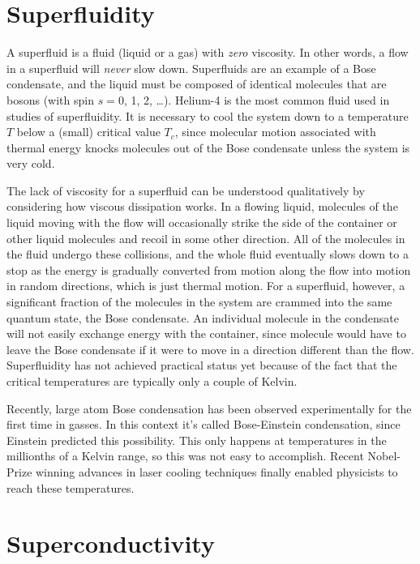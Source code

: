 \section{Superfluidity}

A superfluid is a fluid (liquid or a gas) with {\em zero} viscosity.
In other words, a flow in a superfluid will {\em never} slow down.
Superfluids are an example of a Bose condensate, and the liquid must
be composed of identical molecules that are bosons (with spin $s = 0$,
1, 2, \dots).  Helium-4 is the most common fluid used in studies of
superfluidity.  It is necessary to cool the system down to a
temperature $T$ below a (small) critical value $T_c$, since molecular
motion associated with thermal energy knocks molecules out of the Bose
condensate unless the system is very cold.

The lack of viscosity for a superfluid can be understood qualitatively
by considering how viscous dissipation works.  In a flowing liquid,
molecules of the liquid moving with the flow will occasionally strike
the side of the container or other liquid molecules and recoil in some
other direction.  All of the molecules in the fluid undergo these
collisions, and the whole fluid eventually slows down to a stop as the
energy is gradually converted from motion along the flow into motion
in random directions, which is just thermal motion.  For a superfluid,
however, a significant fraction of the molecules in the system are
crammed into the same quantum state, the Bose condensate.  An
individual molecule in the condensate will not easily exchange energy
with the container, since molecule would have to leave the Bose
condensate if it were to move in a direction different than the flow.
Superfluidity has not achieved practical status yet because of the
fact that the critical temperatures are typically only a couple of
Kelvin.

Recently, large atom Bose condensation has been observed
experimentally for the first time in gasses.  In this context it's
called Bose-Einstein condensation, since Einstein predicted this
possibility.  This only happens at temperatures in the millionths of a
Kelvin range, so this was not easy to accomplish.  Recent Nobel-Prize
winning advances in laser cooling techniques finally enabled
physicists to reach these temperatures.


\section{Superconductivity}

